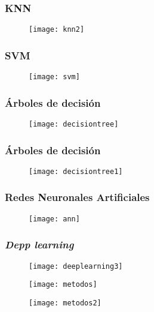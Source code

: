 \documentclass[14pt]{beamer}
\begin{document}
\begin{frame}
\frametitle{KNN}
  \begin{figure}
    \centering
    \texttt{[image: knn2]}
   \end{figure}
\end{frame}
\begin{frame}
\frametitle{SVM}
  \begin{figure}
    \centering
    \texttt{[image: svm]}
   \end{figure}
\end{frame}
\begin{frame}
\frametitle{Árboles de decisión}
  \begin{figure}
    \centering
    \texttt{[image: decisiontree]}
   \end{figure}
\end{frame}
\begin{frame}
\frametitle{Árboles de decisión}
  \begin{figure}
    \centering
    \texttt{[image: decisiontree1]}
   \end{figure}
\end{frame}
\begin{frame}
\frametitle{Redes Neuronales Artificiales}
  \begin{figure}
    \centering
    \texttt{[image: ann]}
   \end{figure}
\end{frame}
\begin{frame}
\frametitle{\emph{Depp learning}}
  \begin{figure}
    \centering
    \texttt{[image: deeplearning3]}
   \end{figure}
\end{frame}
\begin{frame}
  \begin{figure}
    \centering
    \texttt{[image: metodos]}
  \end{figure}
\end{frame}
\begin{frame}
  \begin{figure}
    \centering
    \texttt{[image: metodos2]}
  \end{figure}
\end{frame}
\end{document}
